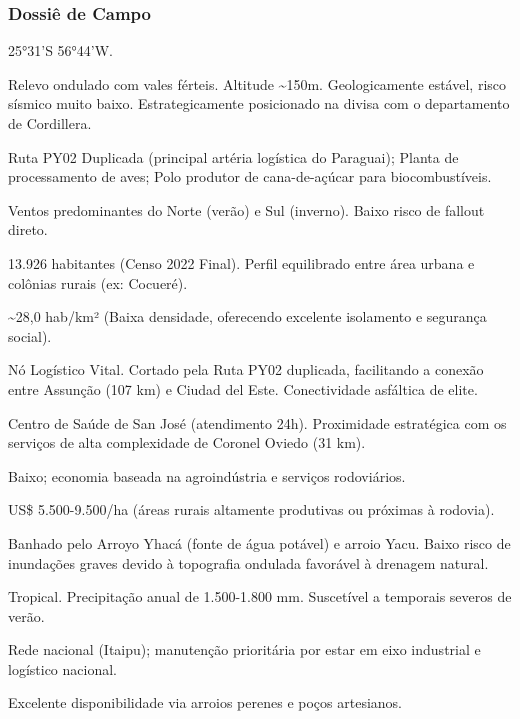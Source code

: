 \subsubsection{Dossiê de Campo}
\begin{description}[style=nextline,leftmargin=0.5cm,font=\bfseries]
\item[Coordenadas]  25°31'S 56°44'W.
\item[Topografia]  Relevo ondulado com vales férteis. Altitude \textasciitilde 150m. Geologicamente estável, risco sísmico muito baixo. Estrategicamente posicionado na divisa com o departamento de Cordillera.
\item[Alvos Estratégicos]  Ruta PY02 Duplicada (principal artéria logística do Paraguai); Planta de processamento de aves; Polo produtor de cana-de-açúcar para biocombustíveis.
\item[Fallout]  Ventos predominantes do Norte (verão) e Sul (inverno). Baixo risco de fallout direto.
\item[População]  13.926 habitantes (Censo 2022 Final). Perfil equilibrado entre área urbana e colônias rurais (ex: Cocueré).
\item[Densidade]  \textasciitilde 28,0 hab/\allowbreak km² (Baixa densidade, oferecendo excelente isolamento e segurança social).
\item[Vias de Acesso]  Nó Logístico Vital. Cortado pela Ruta PY02 duplicada, facilitando a conexão entre Assunção (107 km) e Ciudad del Este. Conectividade asfáltica de elite.
\item[Serviços]  Centro de Saúde de San José (atendimento 24h). Proximidade estratégica com os serviços de alta complexidade de Coronel Oviedo (31 km).
\item[Custo de Vida]  Baixo; economia baseada na agroindústria e serviços rodoviários.
\item[Preço da Terra]  US\$ 5.500-9.500/\allowbreak ha (áreas rurais altamente produtivas ou próximas à rodovia).
\item[Hidrologia]  Banhado pelo Arroyo Yhacá (fonte de água potável) e arroio Yacu. Baixo risco de inundações graves devido à topografia ondulada favorável à drenagem natural.
\item[Clima]  Tropical. Precipitação anual de 1.500-1.800 mm. Suscetível a temporais severos de verão.
\item[Energia]  Rede nacional (Itaipu); manutenção prioritária por estar em eixo industrial e logístico nacional.
\item[Água]  Excelente disponibilidade via arroios perenes e poços artesianos.

\end{description}
